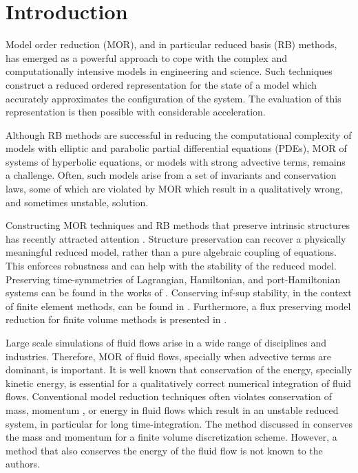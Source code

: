 \section{Introduction} \label{sec:intro}

Model order reduction (MOR), and in particular reduced basis (RB) methods, has emerged as a powerful approach to cope with the complex and computationally intensive models in engineering and science. Such techniques construct a reduced ordered representation for the state of a model which accurately approximates the configuration of the system. The evaluation of this representation is then possible with considerable acceleration.

Although RB methods are successful in reducing the computational complexity of models with elliptic and parabolic partial differential equations (PDEs), MOR of systems of hyperbolic equations, or models with strong advective terms, remains a challenge. Often, such models arise from a set of invariants and conservation laws, some of which are violated by MOR which result in a qualitatively wrong, and sometimes unstable, solution.

Constructing MOR techniques and RB methods that preserve intrinsic structures has recently attracted attention \cite{doi:10.1137/17M1111991,kalashnikova2014stabilization,farhat2015structure,doi:10.1137/110836742,beattie2011structure,doi:10.1137/140978922}. Structure preservation can recover a physically meaningful reduced model, rather than a pure algebraic coupling of equations. This enforces robustness and can help with the stability of the reduced model. Preserving time-symmetries of Lagrangian, Hamiltonian, and port-Hamiltonian systems can be found in the works of \cite{Carlberg:2014ky,doi:10.1137/140978922,doi:10.1137/17M1111991,beattie2011structure,chaturantabut2016structure,gugercin2012structure}. Conserving inf-sup stability, in the context of finite element methods, can be found in \cite{farhat2015structure,ballarin2015supremizer}. Furthermore, a flux preserving model reduction for finite volume methods is presented in \cite{carlberg2018conservative}. 

Large scale simulations of fluid flows arise in a wide range of disciplines and industries. Therefore, MOR of fluid flows, specially when advective terms are dominant, is important. It is well known that conservation of the energy, specially kinetic energy, is essential for a qualitatively correct numerical integration of fluid flows. Conventional model reduction techniques often violates conservation of mass, momentum \cite{carlberg2018conservative}, or energy in fluid flows which result in an unstable reduced system, in particular for long time-integration. The method discussed in \cite{carlberg2018conservative} conserves the mass and momentum for a finite volume discretization scheme. However, a method that also conserves the energy of the fluid flow is not known to the authors.

